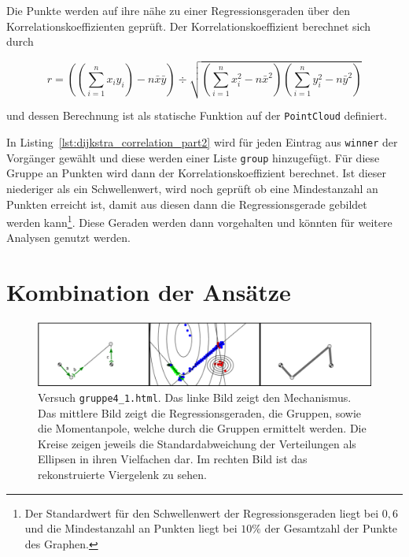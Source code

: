 Die Punkte werden auf ihre nähe zu einer Regressionsgeraden über den Korrelationskoeffizienten geprüft.
Der Korrelationskoeffizient berechnet sich durch~\cite{Papula2014}

\begin{equation}
    r = \left(\left(\sum_{i=1}^n x_i y_i\right) - n \bar{x} \bar{y}\right) \div \sqrt{\left(\sum_{i=1}^n x_i^2 - n\bar{x}^2\right)\left(\sum_{i=1}^n y_i^2 - n \bar{y}^2\right)}
    \label{eq:korrelationskoeffizient}
\end{equation}

und dessen Berechnung ist als statische Funktion auf der \lstinline{PointCloud} definiert.

In Listing~\ref{lst:dijkstra_correlation_part2} wird für jeden Eintrag aus \lstinline{winner} der Vorgänger gewählt und diese werden einer Liste \lstinline{group} hinzugefügt.
Für diese Gruppe an Punkten wird dann der Korrelationskoeffizient berechnet.
Ist dieser niederiger als ein Schwellenwert, wird noch geprüft ob eine Mindestanzahl an Punkten erreicht ist, damit aus diesen dann die Regressionsgerade gebildet werden kann\footnote{Der Standardwert für den Schwellenwert der Regressionsgeraden liegt bei $0,6$ und die Mindestanzahl an Punkten liegt bei $10\%$ der Gesamtzahl der Punkte des Graphen.}.
Diese Geraden werden dann vorgehalten und könnten für weitere Analysen genutzt werden.

\section{Kombination der Ansätze}

\begin{figure}
    \centering
    \includegraphics[width=\textwidth]{gfx/gruppe4_1.png}
    \caption[Versuch \lstinline{gruppe4_1.html}]{Versuch \lstinline{gruppe4_1.html}. Das linke Bild zeigt den Mechanismus. Das mittlere Bild zeigt die Regressionsgeraden, die Gruppen, sowie die Momentanpole, welche durch die Gruppen ermittelt werden. Die Kreise zeigen jeweils die Standardabweichung der Verteilungen als Ellipsen in ihren Vielfachen dar. Im rechten Bild ist das rekonstruierte Viergelenk zu sehen.}
    \label{fig:gruppe4_1}
\end{figure}

